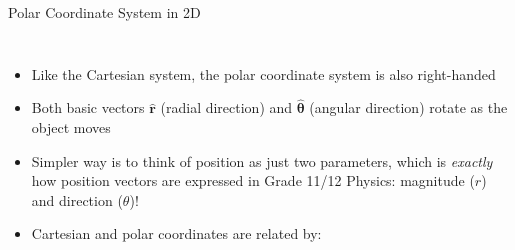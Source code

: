 \documentclass[12pt,compress,aspectratio=169]{beamer}
\begin{document}
\begin{frame}{Polar Coordinate System in 2D}
  \begin{columns}

    \begin{itemize}
    \item Like the Cartesian system, the polar coordinate system is also
      right-handed
    \item Both basic vectors $\hat{\bm{r}}$ (radial direction) and
      $\hat{\bm{\theta}}$ (angular direction) rotate as the object moves
    \item Simpler way is to think of position as just two
      parameters, which is \emph{exactly} how position vectors are expressed in
      Grade 11/12 Physics: magnitude ($r$) and direction ($\theta$)!
    \item Cartesian and polar coordinates are related by:
      
      \vspace{-.35in}{\large
        \begin{align*}
          x&=r\cos\theta\\
          y&=r\sin\theta
        \end{align*}
      }
    \end{itemize}
  \end{columns}
\end{frame}
\end{document}
